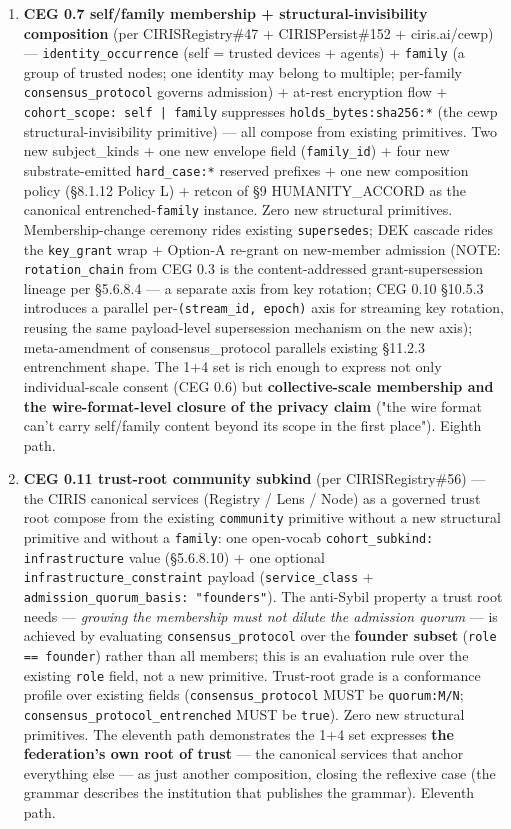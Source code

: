\documentclass[10pt]{article}
\begin{document}
\begin{enumerate}
\item \textbf{CEG 0.7 self/family membership + structural-invisibility composition} (per CIRISRegistry\#47 + CIRISPersist\#152 + ciris.ai/cewp) — \texttt{identity\_occurrence} (self = trusted devices + agents) + \texttt{family} (a group of trusted nodes; one identity may belong to multiple; per-family \texttt{consensus\_protocol} governs admission) + at-rest encryption flow + \texttt{cohort\_scope: self | family} suppresses \texttt{holds\_bytes:sha256:*} (the cewp structural-invisibility primitive) — all compose from existing primitives. Two new subject\_kinds + one new envelope field (\texttt{family\_id}) + four new substrate-emitted \texttt{hard\_case:*} reserved prefixes + one new composition policy (§8.1.12 Policy L) + retcon of §9 HUMANITY\_ACCORD as the canonical entrenched-\texttt{family} instance. Zero new structural primitives. Membership-change ceremony rides existing \texttt{supersedes}; DEK cascade rides the \texttt{key\_grant} wrap + Option-A re-grant on new-member admission (NOTE: \texttt{rotation\_chain} from CEG 0.3 is the content-addressed grant-supersession lineage per §5.6.8.4 — a separate axis from key rotation; CEG 0.10 §10.5.3 introduces a parallel per-\texttt{(stream\_id, epoch)} axis for streaming key rotation, reusing the same payload-level supersession mechanism on the new axis); meta-amendment of consensus\_protocol parallels existing §11.2.3 entrenchment shape. The 1+4 set is rich enough to express not only individual-scale consent (CEG 0.6) but \textbf{collective-scale membership and the wire-format-level closure of the privacy claim} ("the wire format can't carry self/family content beyond its scope in the first place"). Eighth path.
\item \textbf{CEG 0.11 trust-root community subkind} (per CIRISRegistry\#56) — the CIRIS canonical services (Registry / Lens / Node) as a governed trust root compose from the existing \texttt{community} primitive without a new structural primitive and without a \texttt{family}: one open-vocab \texttt{cohort\_subkind: infrastructure} value (§5.6.8.10) + one optional \texttt{infrastructure\_constraint} payload (\texttt{service\_class} + \texttt{admission\_quorum\_basis: "founders"}). The anti-Sybil property a trust root needs — \textit{growing the membership must not dilute the admission quorum} — is achieved by evaluating \texttt{consensus\_protocol} over the \textbf{founder subset} (\texttt{role == founder}) rather than all members; this is an evaluation rule over the existing \texttt{role} field, not a new primitive. Trust-root grade is a conformance profile over existing fields (\texttt{consensus\_protocol} MUST be \texttt{quorum:M/N}; \texttt{consensus\_protocol\_entrenched} MUST be \texttt{true}). Zero new structural primitives. The eleventh path demonstrates the 1+4 set expresses \textbf{the federation's own root of trust} — the canonical services that anchor everything else — as just another composition, closing the reflexive case (the grammar describes the institution that publishes the grammar). Eleventh path.

\end{enumerate}
\end{document}
